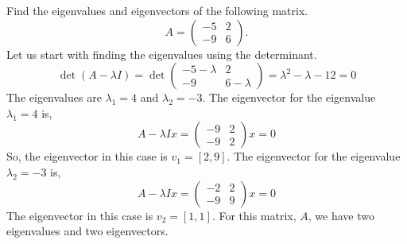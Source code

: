 \documentclass{article}
\begin{document}
Find the eigenvalues and eigenvectors of the following matrix.
\begin{equation}
    A = \begin{pmatrix}
        -5 & 2 \\
        -9 & 6
    \end{pmatrix}.
\end{equation}
Let us start with finding the eigenvalues using the determinant.
\begin{equation}
    \det (A - \lambda I)
    = \det \begin{pmatrix}
        -5 - \lambda & 2 \\
        -9           & 6 - \lambda
    \end{pmatrix}
    = \lambda ^ 2 - \lambda - 12
    = 0
\end{equation}
The eigenvalues are $\lambda_1 = 4$ and $\lambda_2 = - 3$. The eigenvector for the eigenvalue $\lambda_1 = 4$ is,
\begin{equation}
    A - \lambda I x = \begin{pmatrix}
        - 9 & 2 \\
        - 9 & 2
    \end{pmatrix} x
    = 0
\end{equation}
So, the eigenvector in this case is $v_1 = [2, 9]$. The eigenvector for the eigenvalue $\lambda_2 = - 3$ is,
\begin{equation}
    A - \lambda I x = \begin{pmatrix}
        - 2 & 2 \\
        - 9 & 9
    \end{pmatrix} x
    = 0
\end{equation}
The eigenvector in this case is $v_2 = [1, 1]$. For this matrix, $A$, we have two eigenvalues and two eigenvectors.


\end{document}

